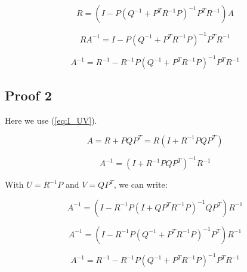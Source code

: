 \documentclass{article}
\begin{document}
\begin{equation}
    R = (I - P (Q^{-1} + P^T R^{-1}P)^{-1} P^T R^{-1}) A
\end{equation}

\begin{equation}
    R A^{-1} = I - P (Q^{-1} + P^T R^{-1}P)^{-1} P^T R^{-1}
\end{equation}

\begin{equation}
    A^{-1} = R^{-1} - R^{-1} P (Q^{-1} + P^T R^{-1}P)^{-1} P^T R^{-1}
\end{equation}

\subsection{Proof 2}

Here we use (\ref{eq:I_UV}).

\begin{equation}
    A = R + PQP^T = R (I + R^{-1} P Q P^T)
\end{equation}

\begin{equation}
    A^{-1} = (I + R^{-1} P Q P^T)^{-1} R^{-1}
\end{equation}

With $U=R^{-1}P$ and $V=QP^T$, we can write:

\begin{equation}
    A^{-1} = (I - R^{-1} P (I + Q P^T R^{-1} P)^{-1} Q P^T) R^{-1}
\end{equation}

\begin{equation}
    A^{-1} = (I - R^{-1} P (Q^{-1} + P^T R^{-1} P)^{-1} P^T) R^{-1}
\end{equation}

\begin{equation}
    A^{-1} = R^{-1} - R^{-1} P (Q^{-1} + P^T R^{-1} P)^{-1} P^T R^{-1}
\end{equation}
\end{document}
